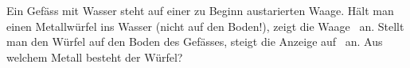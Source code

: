 Ein Gefäss mit Wasser steht auf einer zu Beginn austarierten Waage. Hält man einen Metallwürfel ins Wasser (nicht auf den Boden!), zeigt die Waage \mEiO\ an. Stellt man den Würfel auf den Boden des Gefässes, steigt die Anzeige auf \mBoO\ an. Aus welchem Metall besteht der Würfel?
